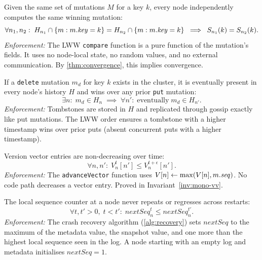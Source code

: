 \begin{invariant}
\label{inv:det-order}
Given the same set of mutations $M$ for a key $k$, every node independently
computes the same winning mutation:
\[
  \forall n_1, n_2:\;
  H_{n_1} \cap \{m : m.\mathit{key} = k\} = H_{n_2} \cap \{m : m.\mathit{key} = k\}
  \;\implies\; S_{n_1}(k) = S_{n_2}(k).
\]
\textit{Enforcement:} The LWW \texttt{compare} function is a pure function of
the mutation's fields. It uses no node-local state, no random values, and no
external communication. By \cref{thm:convergence}, this implies convergence.
\end{invariant}

\begin{invariant}
\label{inv:tombstone}
If a \texttt{delete} mutation $m_d$ for key $k$ exists in the cluster, it is
eventually present in every node's history $H$ and wins over any prior
\texttt{put} mutation:
\[
  \exists n:\; m_d \in H_n \;\implies\;
  \forall n':\; \text{eventually}\; m_d \in H_{n'}.
\]
\textit{Enforcement:} Tombstones are stored in $H$ and replicated through gossip
exactly like put mutations. The LWW order ensures a tombstone with a higher
timestamp wins over prior puts (absent concurrent puts with a higher timestamp).
\end{invariant}

\begin{invariant}
\label{inv:mono-vec}
Version vector entries are non-decreasing over time:
\[
  \forall n, n':\; V_n^t[n'] \leq V_n^{t+\epsilon}[n'].
\]
\textit{Enforcement:} The \texttt{advanceVector} function uses
$V[n] \leftarrow \max(V[n], m.\mathit{seq})$. No code path decreases a vector entry.
Proved in Invariant~\ref{inv:mono-vv}.
\end{invariant}

\begin{invariant}
\label{inv:mono-seq}
The local sequence counter at a node never repeats or regresses across restarts:
\[
  \forall t, t' > 0,\; t < t':\; \mathit{nextSeq}^t_n \leq \mathit{nextSeq}^{t'}_n.
\]
\textit{Enforcement:} The crash recovery algorithm (\cref{alg:recovery}) sets
$\mathit{nextSeq}$ to the maximum of the metadata value, the snapshot value,
and one more than the highest local sequence seen in the log. A node starting
with an empty log and metadata initialises $\mathit{nextSeq} = 1$.
\end{invariant}
